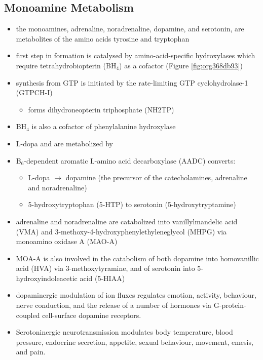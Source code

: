 \documentclass{scrartcl}
\begin{document}
\subsection{Monoamine Metabolism}
\label{sec:org44c28e8}
\begin{itemize}
\item the monoamines, adrenaline, noradrenaline, dopamine, and serotonin,
are metabolites of the amino acids tyrosine and tryptophan
\item first step in formation is catalysed by amino-acid-specific
hydroxylases which require tetrahydrobiopterin (BH\(_{\text{4}}\)) as a cofactor
(Figure \ref{fig:org368db93})
\item synthesis from GTP is initiated by the rate-limiting GTP
cyclohydrolase-1 (GTPCH-I)
\begin{itemize}
\item forms dihydroneopterin triphosphate (NH2TP)
\end{itemize}
\item BH\(_{\text{4}}\) is also a cofactor of phenylalanine hydroxylase
\item L-dopa and  are metabolized by
\item B\(_{\text{6}}\)-dependent aromatic L-amino acid decarboxylase (AADC) converts:
\begin{itemize}
\item L-dopa \(\to\) dopamine (the precursor of the catecholamines, adrenaline and
noradrenaline)
\item 5-hydroxytryptophan (5-HTP) to serotonin (5-hydroxytryptamine)
\end{itemize}
\item adrenaline and noradrenaline are catabolized into vanillylmandelic
acid (VMA) and 3-methoxy-4-hydroxyphenylethyleneglycol (MHPG) via
monoamino oxidase A (MAO-A)
\item MOA-A is also involved in the catabolism of both dopamine into
homovanillic acid (HVA) via 3-methoxytyramine, and of serotonin into
5-hydroxyindoleacetic acid (5-HIAA)
\item dopaminergic modulation of ion fluxes regulates emotion, activity,
behaviour, nerve conduction, and the release of a number of hormones
via G-protein-coupled cell-surface dopamine
receptors.
\item Serotoninergic neurotransmission modulates body temperature, blood
pressure, endocrine secretion, appetite, sexual behaviour, movement,
emesis, and pain.
\end{itemize}
\end{document}
